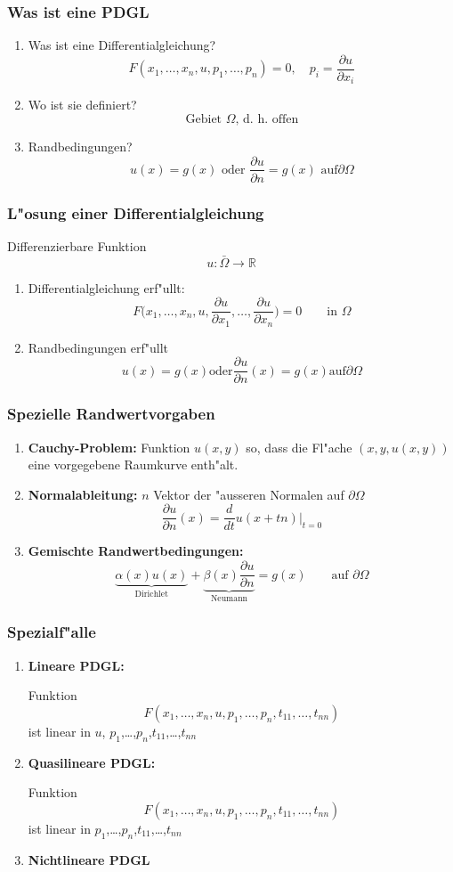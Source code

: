 \begin{frame}
\frametitle{Was ist eine PDGL}
\begin{enumerate}
\item Was ist eine Differentialgleichung?
\[
F( x_1,\dots,x_n,u,p_1, \dots,p_n) =0,\quad p_i=\frac{\partial u}{\partial x_i}
\]
\item Wo ist sie definiert?
\[
\text{Gebiet $\Omega$, d.~h.~offen}
\]
\item Randbedingungen?
\[
\text{$u(x)=g(x)$ oder $\frac{\partial u}{\partial n}=g(x)$ auf
$\partial\Omega$}
\]
\end{enumerate}
\end{frame}

\begin{frame}
\frametitle{L"osung einer Differentialgleichung}
Differenzierbare Funktion
\[
u\colon \bar\Omega\to\mathbb R
\]
\pause
\begin{enumerate}
\item Differentialgleichung erf"ullt:
\[
F\biggl(x_1,\dots,x_n,u,
\frac{\partial u}{\partial x_1},\dots, \frac{\partial u}{\partial x_n}
\biggr)=0\qquad\text{in $\Omega$}
\]
\pause
\item Randbedingungen erf"ullt
\[
\text{
$u(x)=g(x)$
oder
$\frac{\partial u}{\partial n}(x)=g(x)$
auf
$\partial\Omega$
}
\]
\end{enumerate}
\end{frame}

\begin{frame}
\frametitle{Spezielle Randwertvorgaben}
\begin{enumerate}
\item {\bf Cauchy-Problem:}
\pause
Funktion $u(x,y)$ so, dass die Fl"ache $(x,y,u(x,y))$ eine vorgegebene
Raumkurve enth"alt.
\medskip

\pause
\item {\bf Normalableitung:}
\pause
$n$ Vektor der "ausseren Normalen auf $\partial\Omega$
\[
\frac{\partial u}{\partial n}(x)
=
\frac{d}{dt}u(x+tn)\bigg|_{t=0}
\]
\pause
\item {\bf Gemischte Randwertbedingungen:}
\pause
\[
\underbrace{
\alpha(x) u(x)
}_{\text{Dirichlet}}
+
\underbrace{
\beta(x)\frac{\partial u}{\partial n}
}_{\text{Neumann}}
= g(x) 
\qquad
\text{auf $\partial\Omega$}
\]
\end{enumerate}
\end{frame}

\begin{frame}
\frametitle{Spezialf"alle}
\begin{enumerate}
\item {\bf Lineare PDGL:}

\pause
Funktion
\[
F(x_1,\dots,x_n,u,p_1,\dots,p_n,t_{11},\dots,t_{nn})
\]
ist linear in {\color{red}$u$}, $p_1$,\dots,$p_n$,$t_{11}$,\dots,$t_{nn}$
\pause
\item {\bf Quasilineare PDGL:}

\pause
Funktion
\[
F(x_1,\dots,x_n,u,p_1,\dots,p_n,t_{11},\dots,t_{nn})
\]
ist linear in $p_1$,\dots,$p_n$,$t_{11}$,\dots,$t_{nn}$
\pause
\item {\bf Nichtlineare PDGL}
\end{enumerate}
\end{frame}


